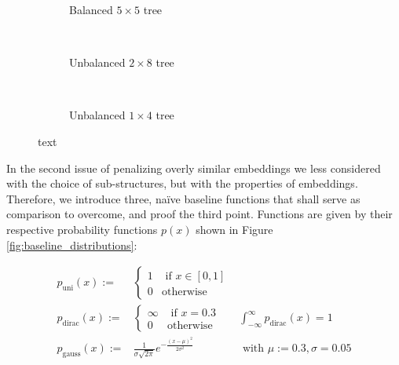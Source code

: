 \documentclass[]{article}
\begin{document}
\begin{figure}
	\centering
	\begin{subfigure}{1.\textwidth}
		\centering
		\caption{Balanced $5\times 5$ tree}
		\label{fig:tree_balanced}
	\end{subfigure}\\
	
	\begin{subfigure}{1.\textwidth}
		\centering
		\label{fig:tree_unbalanced}
		\caption{Unbalanced $2\times 8$ tree}
	\end{subfigure}	\\
	\begin{subfigure}{1.\textwidth}
		\centering
		\label{fig:tree_unbalanced_reduced}
		\caption{Unbalanced $1\times 4$ tree}
	\end{subfigure}	

	\caption{text}
	\label{fig:trees}
\end{figure}


In the second issue of penalizing overly similar embeddings we less considered with the choice of sub-structures, but with the properties of embeddings. Therefore, we introduce three, na\"ive baseline functions that shall serve as comparison to overcome, and proof the third point. Functions are given by their respective probability functions $p(x)$ shown in Figure \ref{fig:baseline_distributions}:

\begin{align}
	p_\text{uni}(x):=&\begin{cases}
		1 & \text{ if }x\in [0,1]\\
		0& \text{otherwise}
	\end{cases}&\\
	p_\text{dirac}(x):= &\begin{cases}
		\infty & \text{ if }x=0.3\\
		0& \text{otherwise}
	\end{cases} &\int_{-\infty}^{\infty}p_\text{dirac}(x)=1\\
	p_\text{gauss}(x):=&\frac{1}{{\sigma \sqrt {2\pi } }}e^{-\frac{(x-\mu)^2}{2\sigma^2}} &\text{ with }\mu:=0.3, \sigma=0.05
\end{align}
\end{document}

